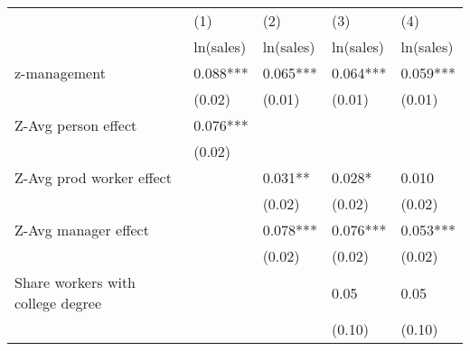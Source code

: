 
\begin{tabular}{lllll}
    \toprule
                                  & (1)      & (2)       & (3)       & (4)       \\
                                  & ln(sales)& ln(sales)& ln(sales)& ln(sales) \\
    \midrule
z-management                      & 0.088*** & 0.065***  & 0.064***  & 0.059***  \\
                                  & (0.02)   & (0.01)    & (0.01)    & (0.01)    \\
Z-Avg person effect               & 0.076*** &           &           &           \\
                                  & (0.02)   &           &           &           \\
Z-Avg prod worker effect          &          & 0.031**   & 0.028*    & 0.010     \\
                                  &          & (0.02)    & (0.02)    & (0.02)    \\
Z-Avg manager effect              &          & 0.078***  & 0.076***  & 0.053***  \\
                                  &          & (0.02)    & (0.02)    & (0.02)    \\
Share workers with college degree &          &           & 0.05      & 0.05      \\
                                  &          &           & (0.10)    & (0.10)    \\

\end{tabular}
